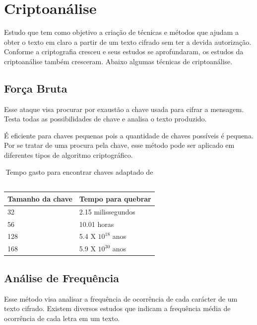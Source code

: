%
\section{Criptoanálise}
\label{cryptanalysis}

Estudo que tem como objetivo a criação de técnicas e métodos que ajudam a obter o texto em claro a partir de um texto cifrado sem ter a devida autorização. Conforme a criptografia cresceu e seus estudos se aprofundaram, os estudos da criptoanálise também cresceram. Abaixo algumas técnicas de criptoanálise.

\subsection{Força Bruta}
\label{brute-force}

Esse ataque visa procurar por exaustão a chave usada para cifrar a mensagem. Testa todas as possibilidades de chave e analisa o texto produzido. 

É eficiente para chaves pequenas pois a quantidade de chaves possíveis é pequena. Por se tratar de uma procura pela chave, esse método pode ser aplicado em diferentes tipos de algoritmo criptográfico.

\begin{table}[h]
\centering
	\begin{tabular}{|l|l|}
		\hline
		Tamanho da chave & Tempo para quebrar \\ \hline
		32 & 2.15 milissegundos \\ \hline
		56 & 10.01 horas \\ \hline
		128 & 5.4 X $ 10 ^{18}$ anos \\ \hline
		168 & 5.9 X $ 10 ^{30}$ anos \\ \hline
	\end{tabular}
\caption[{Tempo gasto para encontrar chaves}] {Tempo gasto para encontrar chaves adaptado de ~\cite{william-stallings}}
\end{table}

\subsection{Análise de Frequência}
\label{frequency-analysis}

Esse método visa analisar a frequência de ocorrência de cada carácter de um texto cifrado. Existem diversos estudos que indicam a frequência média de ocorrência de cada letra em um texto. 

